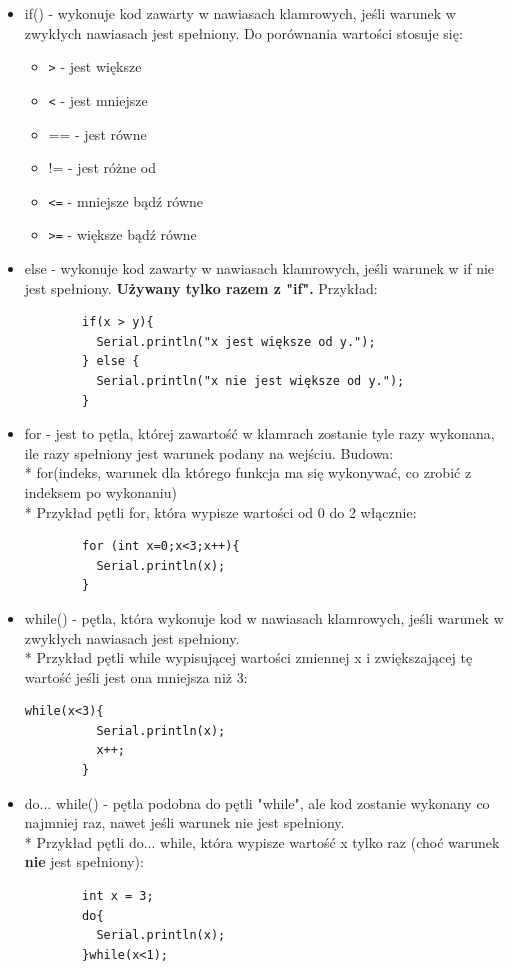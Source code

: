 \documentclass[a4paper,12pt, twoside]{article}
\begin{document}
	\begin{itemize}
		\item if(){} - wykonuje kod zawarty w nawiasach klamrowych, jeśli warunek w zwykłych nawiasach jest spełniony. Do porównania wartości stosuje się:
			\begin{itemize}
				\item \verb|>| - jest większe
				\item \verb|<|  - jest mniejsze
				\item == - jest równe
				\item != - jest różne od
				\item \verb|<=| - mniejsze bądź równe
				\item \verb|>=| - większe bądź równe
			\end{itemize}
		\item else - wykonuje kod zawarty w nawiasach klamrowych, jeśli warunek w if nie jest spełniony. \textbf{Używany tylko razem z "if".} Przykład:
		\begin{verbatim}
		if(x > y){
		  Serial.println("x jest większe od y.");
		} else {
		  Serial.println("x nie jest większe od y.");
		}
		\end{verbatim}
		\item for - jest to pętla, której zawartość w klamrach zostanie tyle razy wykonana, ile razy spełniony jest warunek podany na wejściu. Budowa:\\*
		for(indeks, warunek dla którego funkcja ma się wykonywać, co zrobić z indeksem po wykonaniu){}\\*
		Przykład pętli for, która wypisze wartości od 0 do 2 włącznie:
		\begin{verbatim}
		for (int x=0;x<3;x++){
		  Serial.println(x);
		}
		\end{verbatim}
		\item while() - pętla, która wykonuje kod w nawiasach klamrowych, jeśli warunek w zwykłych nawiasach jest spełniony.\\*
		Przykład pętli while wypisującej wartości zmiennej x i zwiększającej tę wartość jeśli jest ona mniejsza niż 3:
		\begin{verbatim}while(x<3){
		  Serial.println(x);
		  x++;
		}
		\end{verbatim}
		\item do... while() - pętla podobna do pętli "while", ale kod zostanie wykonany co najmniej raz, nawet jeśli warunek nie jest spełniony. \\*
		Przykład pętli do... while, która wypisze wartość x tylko raz (choć warunek \textbf{nie} jest spełniony):
		\begin {verbatim}
		int x = 3;
		do{
		  Serial.println(x);
		}while(x<1);
		\end{verbatim}
		
	\end{itemize}
\end{document}
